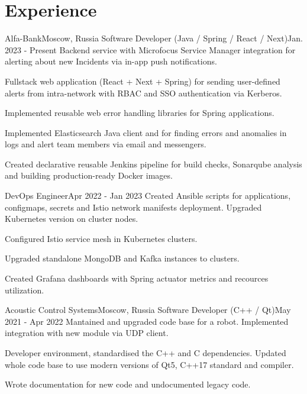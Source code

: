 

\section{Experience}\label{sec:experience}
\resumeSubHeadingListStart

\resumeSubheading
{Alfa-Bank}{Moscow, Russia}
    {Software Developer (Java / Spring / React / Next)}{Jan. 2023 - Present}
    \resumeItemListStart
        {Backend service with Microfocus Service Manager integration for alerting about new Incidents via in-app push notifications.}

        {Fullstack web application (React + Next + Spring) for sending user-defined alerts from intra-network with RBAC and SSO authentication via Kerberos.}

        {Implemented reusable web error handling libraries for Spring applications.}

        {Implemented Elasticsearch Java client and for finding errors and anomalies in logs and alert team members via email and messengers.}

        {Created declarative reusable Jenkins pipeline for build checks, Sonarqube analysis and building production-ready Docker images.}
    \resumeItemListEnd

\resumeSubSubheading
{DevOps Engineer}{Apr 2022 - Jan 2023}
    \resumeItemListStart
        {Created Ansible scripts for applications, configmaps, secrets and Istio network manifests deployment. Upgraded Kubernetes version on cluster nodes.}

        {Configured Istio service mesh in Kubernetes clusters.}

        {Upgraded standalone MongoDB and Kafka instances to clusters.}

        {Created Grafana dashboards with Spring actuator metrics and recources utilization.}
    \resumeItemListEnd

\resumeSubheading
{Acoustic Control Systems}{Moscow, Russia}
    {Software Developer (C++ / Qt)}{May 2021 - Apr 2022}
    \resumeItemListStart
        {Mantained and upgraded code base for a robot. Implemented integration with new module via UDP client.}

        {Developer environment, standardised the C++ and C dependencies. Updated whole code base to use modern versions of Qt5, C++17 standard and compiler.}

        {Wrote documentation for new code and undocumented legacy code.}
    \resumeItemListEnd
\resumeSubHeadingListEnd